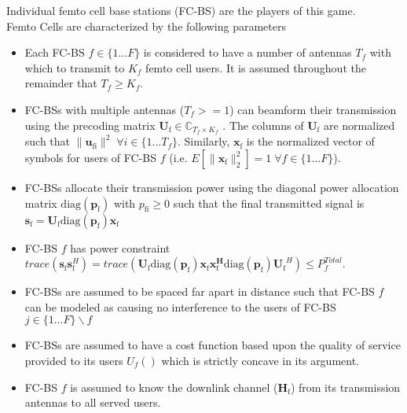 \documentclass[12pt]{article}
\begin{document}
Individual femto cell base stations (FC-BS) are the players of this game.
\\
Femto Cells are characterized by the following parameters
\begin{itemize}
\item 
	Each FC-BS  $f \in \{1 ... F\}$ is considered to have a number of antennas $T_f$ with which to transmit to $K_f$ femto cell users. It is assumed throughout the remainder that $T_f \geq K_f$.
\\
\item 
	FC-BSs with multiple antennas ($T_f >=1$) can beamform their transmission using the precoding 	
	matrix $\mathbf{U}_{\mathrm{f}} \in \mathbb{C}_{T_f \times K_f}$ .
	The columns of $\mathbf{U}_{\mathrm{f}}$ are normalized such that 
	 $\|\mathbf{u}_{\mathrm{fi}}\|^2  \;\forall i \in \{1 ... T_f\}$.
	 Similarly, $\mathbf{x_{\mathrm{f}}}$ is the 		
	normalized vector of symbols for users of FC-BS $f$ (i.e. $E[\|\mathbf{x}_{\mathrm{f}}
	\|_2^2]=1 \; \forall f \in \{1 ... F\}$).
\\
\item  
	FC-BSs allocate their transmission power using the diagonal power allocation  	
	matrix $\mathrm{diag}(\mathbf{p}_{\mathrm{f}})$ with $p_{\mathrm{fi}} \geq 0 $
such that the final transmitted 		
	signal is 
	$\mathbf{s}_{\mathrm{f}	}= \mathbf{U_{\mathrm{f}}} 
	\mathrm{diag}(\mathbf{p}_{\mathrm{f}})
	\mathbf{x_{\mathrm{f}}}$
\\
\item 
	FC-BS $f$ has power constraint 
	$trace(\mathbf{s}_\mathrm{f}\mathbf{s}_\mathrm{f}^H) =
	 trace(\mathbf{U_{\mathrm{f}}} 
	\mathrm{diag}(\mathbf{p}_{\mathrm{f}})
	\mathbf{x_{\mathrm{f}}}
	\mathbf{x_{\mathrm{f}}^H}
	\mathrm{diag}(\mathbf{p}_{\mathrm{f}})
	\mathbf{U_{\mathrm{f}}}^H 
	)
	  \leq P^{Total}_{f} $.
\\
\item
	 FC-BSs are assumed to be spaced far apart in distance such that FC-BS $f$ can be modeled as 
	 causing no interference to the users of FC-BS $j \in \{1 ... F\}\backslash f$
\item 
	FC-BSs are assumed to have a cost function  based upon the quality of service 		
	provided to its users $U_f()$ which is strictly concave in its argument.

\item 
	FC-BS $f$ is assumed to know the downlink channel ($\mathbf{H_\mathrm{f}}$) from its transmission 		
	antennas to all served users.
\\
\end{itemize}
\end{document}
